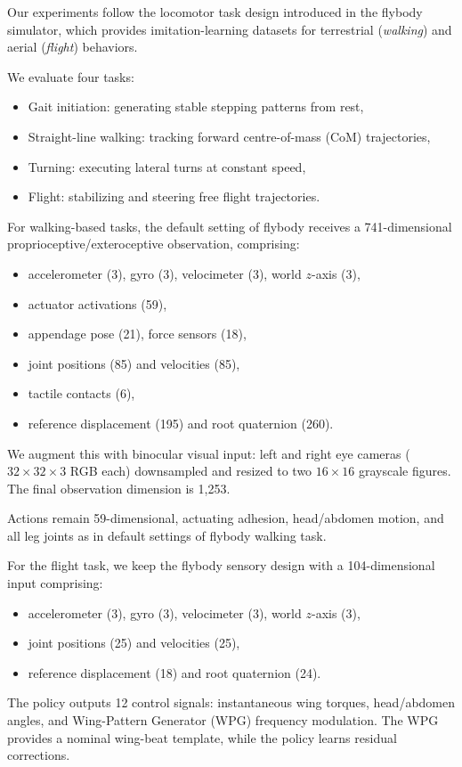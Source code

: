 \documentclass{article}
\theoremstyle{plain}
\theoremstyle{definition}
\theoremstyle{remark}
\begin{document}
Our experiments follow the locomotor task design introduced in the flybody simulator, which provides imitation-learning datasets for terrestrial (\emph{walking}) and aerial (\emph{flight}) behaviors. 

We evaluate four tasks: 
\begin{itemize}
\setlength{\itemsep}{0pt}
\setlength{\parsep}{0pt}
\setlength{\parskip}{0pt}
    \item Gait initiation: generating stable stepping patterns from rest, 
    \item Straight-line walking: tracking forward centre-of-mass (CoM) trajectories, 
    \item Turning: executing lateral turns at constant speed, 
    \item Flight: stabilizing and steering free flight trajectories.
\end{itemize}
For walking-based tasks, the default setting of flybody receives a 741-dimensional proprioceptive/exteroceptive observation, comprising:
\begin{itemize}
\setlength{\itemsep}{0pt}
\setlength{\parsep}{0pt}
\setlength{\parskip}{0pt}
  \item accelerometer (3), gyro (3), velocimeter (3), world $z$-axis (3),
  \item actuator activations (59),
  \item appendage pose (21), force sensors (18),
  \item joint positions (85) and velocities (85),
  \item tactile contacts (6),
  \item reference displacement (195) and root quaternion (260).
\end{itemize}
We augment this with binocular visual input: left and right eye cameras ($32\times32\times3$ RGB each) downsampled and resized to two $16\times16$ grayscale figures. The final observation dimension is 1,253.  

Actions remain 59-dimensional, actuating adhesion, head/abdomen motion, and all leg joints as in default settings of flybody walking task.

For the flight task, we keep the flybody sensory design with a 104-dimensional input comprising:
\begin{itemize}
\setlength{\itemsep}{0pt}
\setlength{\parsep}{0pt}
\setlength{\parskip}{0pt}
    \item accelerometer (3), gyro (3), velocimeter (3), world $z$-axis (3),
    \item joint positions (25) and velocities (25),
    \item reference displacement (18) and root quaternion (24).
\end{itemize}
The policy outputs 12 control signals: instantaneous wing torques, head/abdomen angles, and Wing-Pattern Generator (WPG) frequency modulation. The WPG provides a nominal wing-beat template, while the policy learns residual corrections.
\end{document}
